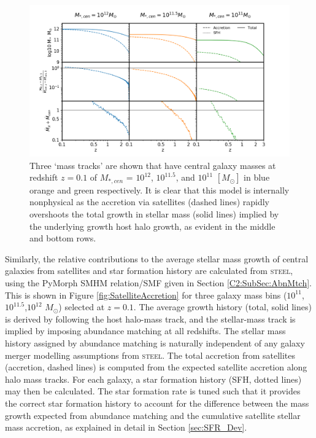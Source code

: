 \begin{figure}[h]
    \centering
    \includegraphics[width = \linewidth]{Figures/Chapter4/SatelliteAccretion_cMod.png}
    \caption{Three `mass tracks' are shown that have central galaxy masses at redshift $z = 0.1$ of $M_{*,cen}$ = $10^{12}$, $10^{11.5}$, and $10^{11}$ $[M_{\odot}]$ in blue orange and green respectively. It is clear that this model is internally nonphysical as the accretion via satellites (dashed lines) rapidly overshoots the total growth in stellar mass (solid lines) implied by the underlying growth host halo growth, as evident in the middle and bottom rows.}
    \label{fig:SatelliteAccretioncMod}
\end{figure}

Similarly, the relative contributions to the average stellar mass growth of central galaxies from satellites and star formation history are calculated from \textsc{steel}, using the PyMorph SMHM relation/SMF given in Section \ref{C2:SubSec:AbnMtch}. This is shown in Figure \ref{fig:SatelliteAccretion} for three galaxy mass bins ($10^{11}$,$10^{11.5}$,$10^{12}$ $M_{\odot}$) selected at $z = 0.1$. The average growth history (total, solid lines) is derived by following the host halo-mass track, and the stellar-mass track is implied by imposing abundance matching at all redshifts. The stellar mass history assigned by abundance matching is naturally independent of any galaxy merger modelling assumptions from \textsc{steel}. The total accretion from satellites (accretion, dashed lines) is computed from the expected satellite accretion along halo mass tracks. For each galaxy, a star formation history (SFH, dotted lines) may then be calculated. The star formation rate is tuned such that it provides the correct star formation history to account for the difference between the mass growth expected from abundance matching and the cumulative satellite stellar mass accretion, as explained in detail in Section \ref{sec:SFR_Dev}.

